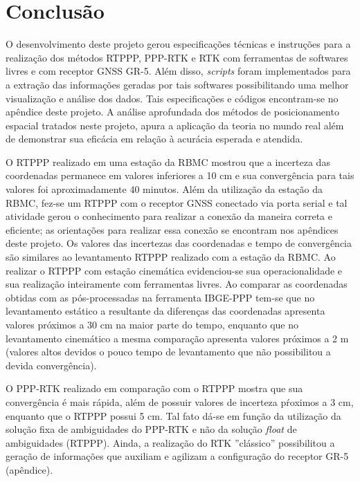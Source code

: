 \chapter{Conclusão}

O desenvolvimento deste projeto gerou especificações técnicas e instruções para a realização dos métodos RTPPP, PPP-RTK e RTK com ferramentas de softwares livres e com receptor GNSS GR-5. Além disso, \textit{scripts} foram implementados para a extração das informações geradas por tais softwares possibilitando uma melhor visualização e análise dos dados. Tais especificações e códigos encontram-se no apêndice deste projeto. A análise aprofundada dos métodos de posicionamento espacial tratados neste projeto, apura a aplicação da teoria no mundo real além de demonstrar sua eficácia em relação à acurácia esperada e atendida. 

O RTPPP realizado em uma estação da RBMC mostrou que a incerteza das coordenadas permanece em valores inferiores a 10 cm e sua convergência para tais valores foi aproximadamente 40 minutos. Além da utilização da estação da RBMC, fez-se um RTPPP com o receptor GNSS conectado via porta serial e tal atividade gerou o conhecimento para realizar a conexão da maneira correta e eficiente; as orientações para realizar essa conexão se encontram nos apêndices deste projeto. Os valores das incertezas das coordenadas e tempo de convergência são similares ao levantamento RTPPP realizado com a estação da RBMC. Ao realizar o RTPPP com estação cinemática evidenciou-se sua operacionalidade e sua realização inteiramente com ferramentas livres. Ao comparar as coordenadas obtidas com as pós-processadas na ferramenta IBGE-PPP tem-se que no levantamento estático a resultante da diferenças das coordenadas apresenta valores próximos a 30 cm na maior parte do tempo, enquanto que no levantamento cinemático a mesma comparação apresenta valores próximos a 2 m (valores altos devidos o pouco tempo de levantamento que não possibilitou a devida convergência).

O PPP-RTK realizado em comparação com o RTPPP mostra que sua convergência é mais rápida, além de possuir valores de incerteza pŕoximos a 3 cm, enquanto que o RTPPP possui 5 cm. Tal fato dá-se em função da utilização da solução fixa de ambiguidades do PPP-RTK e não da solução \textit{float} de ambiguidades (RTPPP). Ainda, a realização do RTK ''clássico'' possibilitou a geração de informações que auxiliam e agilizam a configuração do receptor GR-5 (apêndice).


